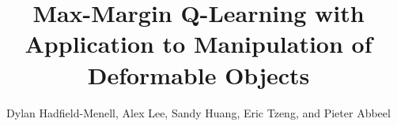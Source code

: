 \documentclass[conference]{IEEEtran}
\begin{document}
\title{Max-Margin Q-Learning with Application to Manipulation of Deformable Objects}

\author{Dylan Hadfield-Menell, Alex Lee, Sandy Huang, Eric Tzeng, and Pieter Abbeel}





% 
\end{document}
